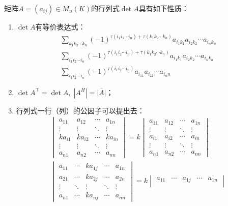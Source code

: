 \begin{property}\label{prop:Determinant}
	矩阵$A=(a_{ij})\in M_{n}(K)$的行列式$\det A$具有如下性质：
	\begin{enumerate}
		\item $\det A$有等价表达式：
		\begin{gather*}
			\sum_{k_1k_2\cdots k_n}(-1)^{\tau(i_1i_2\cdots i_n)+\tau(k_1k_2\cdots k_n)}a_{i_1k_1}a_{i_2k_2}\cdots a_{i_nk_n} \\
			\sum_{i_1i_2\cdots i_n}(-1)^{\tau(i_1i_2\cdots i_n)+\tau(k_1k_2\cdots k_n)}a_{i_1k_1}a_{i_2k_2}\cdots a_{i_nk_n} \\
			\sum_{i_1i_2\cdots i_n}(-1)^{\tau(i_1i_2\cdots i_n)}a_{i_11}a_{i_22}\cdots a_{i_nn}
		\end{gather*}
		\item $\det A^{\top}=\det A,\;|A^H|=\overline{|A|}$；
		\item 行列式一行（列）的公因子可以提出去：
		\begin{gather*}
			\begin{vmatrix}
				a_{11} & a_{12} & \cdots & a_{1n} \\
				\vdots & \vdots & \ddots & \vdots \\
				ka_{i1} & ka_{i2} & \cdots & ka_{in} \\
				\vdots & \vdots & \ddots & \vdots \\
				a_{n1} & a_{n2} & \cdots & a_{nn}
			\end{vmatrix}=k
			\begin{vmatrix}
				a_{11} & a_{12} & \cdots & a_{1n} \\
				\vdots & \vdots & \ddots & \vdots \\
				a_{i1} & a_{i2} & \cdots & a_{in} \\
				\vdots & \vdots & \ddots & \vdots \\
				a_{n1} & a_{n2} & \cdots & a_{nn}
			\end{vmatrix} \\
			\begin{vmatrix}
				a_{11} & \cdots & ka_{1j} & \cdots & a_{1n} \\
				a_{21} & \cdots & ka_{2j} & \cdots & a_{2n} \\
				\vdots & \ddots & \vdots & \ddots & \vdots \\
				a_{n1} & \cdots & ka_{nj} & \cdots & a_{nn}
			\end{vmatrix}=k
			\begin{vmatrix}
				a_{11} & \cdots & a_{1j} & \cdots & a_{1n} \\

\end{vmatrix}
\end{gather*}
\end{enumerate}
\end{property}
